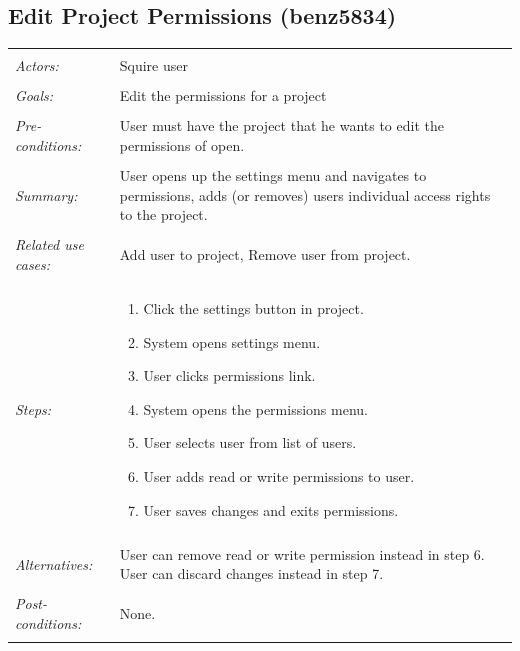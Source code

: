 \documentclass[11pt]{report}
\begin{document}
\subsection{Edit Project Permissions (benz5834)}
\begin{tabular}{ p{2cm} p{12cm} }
 \hline
 \\
 \textit{Actors:} & Squire user \\ 
 \\
 \textit{Goals:} & Edit the permissions for a project \\
 \\
 \textit{Pre-conditions:} & User must have the project that he wants to edit the permissions of open. \\
 \\
 \textit{Summary:} & User opens up the settings menu and navigates to permissions, adds (or removes) users individual access rights to the project.  \\ 
 \\
 \textit{Related use cases:} & Add user to project, Remove user from project. \\ 
 \\
 \textit{Steps:} & \begin{enumerate}
  \item Click the settings button in project.
  \item System opens settings menu.
  \item User clicks permissions link.
  \item System opens the permissions menu.
  \item User selects user from list of users.
  \item User adds read or write permissions to user.
  \item User saves changes and exits permissions.
 \end{enumerate} \\
 \\
 \textit{Alternatives:} & User can remove read or write permission instead in step 6. User can discard changes instead in step 7. \\
 \\
 \textit{Post-conditions:} & None. \\
 \\
\hline
\end{tabular}
\end{document}
